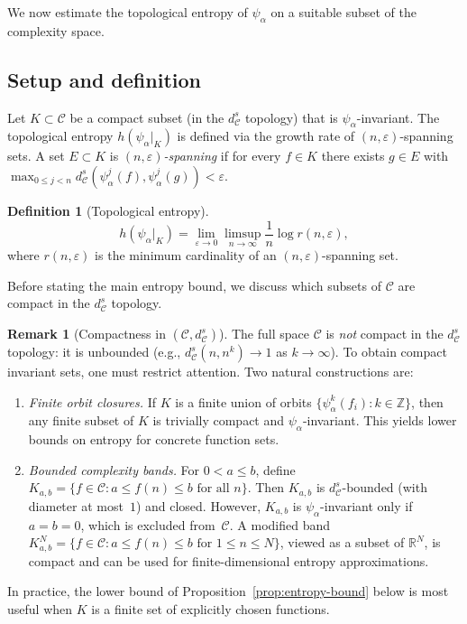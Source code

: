 \documentclass[11pt,a4paper]{article}
\theoremstyle{plain}
\theoremstyle{definition}
\newtheorem{definitioninner}[theoreminner]{Definition}
\newtheorem{remarkinner}[theoreminner]{Remark}
\newenvironment{definition}[1][]{\begin{definitioninner}[#1]}{\end{definitioninner}}
\newenvironment{remark}[1][]{\begin{remarkinner}[#1]}{\end{remarkinner}}
\newcommand{\R}{\mathbb{R}}
\newcommand{\Z}{\mathbb{Z}}
\newcommand{\C}{\mathcal{C}}
\newcommand{\eps}{\varepsilon}
\begin{document}
We now estimate the topological entropy of $\psi_\alpha$ on a
suitable subset of the complexity space.

\subsection{Setup and definition}

Let $K\subset\C$ be a compact subset (in the $d_\C^s$ topology)
that is $\psi_\alpha$-invariant.  The topological entropy
$h(\psi_\alpha|_K)$ is defined via the growth rate of $(n,\eps)$-spanning
sets.  A set $E\subset K$ is \emph{$(n,\eps)$-spanning} if for every
$f\in K$ there exists $g\in E$ with
$\max_{0\le j<n}d_\C^s(\psi_\alpha^j(f),\psi_\alpha^j(g))<\eps$.

\begin{definition}[Topological entropy]
\[
  h(\psi_\alpha|_K)
  = \lim_{\eps\to 0}\limsup_{n\to\infty}\frac{1}{n}\log r(n,\eps),
\]
where $r(n,\eps)$ is the minimum cardinality of an
$(n,\eps)$-spanning set.
\end{definition}

Before stating the main entropy bound, we discuss which subsets of
$\C$ are compact in the $d_\C^s$ topology.

\begin{remark}[Compactness in $(\C,d_\C^s)$]\label{rem:compactness}
The full space $\C$ is \emph{not} compact in the $d_\C^s$ topology:
it is unbounded (e.g., $d_\C^s(n,n^k)\to 1$ as $k\to\infty$).
To obtain compact invariant sets, one must restrict attention.
Two natural constructions are:
\begin{enumerate}[label=\textup{(\roman*)}]
  \item \emph{Finite orbit closures.}  If $K$ is a finite union
    of orbits $\{\psi_\alpha^k(f_i):k\in\Z\}$, then any finite
    subset of $K$ is trivially compact and $\psi_\alpha$-invariant.
    This yields lower bounds on entropy for concrete function sets.
  \item \emph{Bounded complexity bands.}  For $0<a\le b$, define
    $K_{a,b}=\{f\in\C : a\le f(n)\le b \text{ for all }n\}$.
    Then $K_{a,b}$ is $d_\C^s$-bounded (with diameter at most~$1$)
    and closed.  However, $K_{a,b}$ is $\psi_\alpha$-invariant only
    if $a=b=0$, which is excluded from~$\C$.  A modified band
    $K_{a,b}^N=\{f\in\C : a\le f(n)\le b \text{ for }1\le n\le N\}$,
    viewed as a subset of $\R^N$, is compact and can be used for
    finite-dimensional entropy approximations.
\end{enumerate}
In practice, the lower bound of
Proposition~\ref{prop:entropy-bound} below is most useful when $K$
is a finite set of explicitly chosen functions.
\end{remark}
\end{document}
